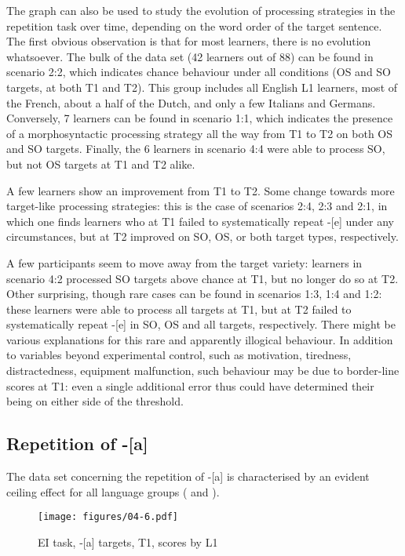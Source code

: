 The graph can also be used to study the evolution of processing strategies in the repetition task over time, depending on the word order of the target sentence. The first obvious observation is that for most learners, there is no evolution whatsoever. The bulk of the data set (42 learners out of 88) can be found in scenario 2:2, which indicates chance behaviour under all conditions (OS and SO targets, at both T1 and T2). This group includes all English L1 learners, most of the French, about a half of the Dutch, and only a few Italians and Germans. Conversely, 7 learners can be found in scenario 1:1, which indicates the presence of a morphosyntactic processing strategy all the way from T1 to T2 on both OS and SO targets. Finally, the 6 learners in scenario 4:4 were able to process SO, but not OS targets at T1 and T2 alike.

A few learners show an improvement from T1 to T2. Some change towards more target-like processing strategies: this is the case of scenarios 2:4, 2:3 and 2:1, in which one finds learners who at T1 failed to systematically repeat -[e] under any circumstances, but at T2 improved on SO, OS, or both target types, respectively. 

A few participants seem to move away from the target variety: learners in scenario 4:2 processed SO targets above chance at T1, but no longer do so at T2. Other surprising, though rare cases can be found in scenarios 1:3, 1:4 and 1:2: these learners were able to process all targets at T1, but at T2 failed to systematically repeat -[e] in SO, OS and all targets, respectively. There might be various explanations for this rare and apparently illogical behaviour. In addition to variables beyond experimental control, such as motivation, tiredness, distractedness, equipment malfunction, such behaviour may be due to border-line scores at T1: even a single additional error thus could have determined their being on either side of the threshold. 

\subsection{Repetition of -[a]}\label{sec:04:2.5}

The data set concerning the repetition of -[a] is characterised by an evident ceiling effect for all language groups ( and ).

\begin{figure}
    \texttt{[image: figures/04-6.pdf]}
    \caption{EI task, -[a] targets, T1, scores by L1}
    \label{fig:04:6}
\end{figure}


